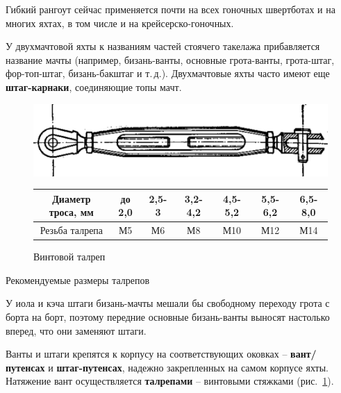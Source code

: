 \documentclass[a4paper, 12pt, twoside, final]{scrbook}
\begin{document}
Гибкий рангоут сейчас применяется почти на всех гоночных швертботах
и на многих яхтах, в том числе и на крейсерско-гоночных.

У двухмачтовой яхты к названиям частей стоячего такелажа прибавляется
название мачты (например, бизань-ванты, основные грота-ванты, грота-штаг,
фор-топ-штаг, бизань-бакштаг и т.\,д.). Двухмачтовые яхты часто имеют
еще \textbf{штаг-карнаки}, соединяющие топы мачт.

\begin{figure}[htbp]
\begin{centering}
\includegraphics{Vintovoj_talrep}
\par\end{centering}

\protect\caption{\label{fig:40}Винтовой талреп}


\bigskip{}


\begin{centering}
\begin{tabular}{|c|c|c|c|c|c|c|}
\hline 
Диаметр троса, мм & до 2,0 & 2,5\-- 3 & 3,2\-- 4,2 & 4,5\-- 5,2 & 5,5\-- 6,2 & 6,5\-- 8,0\tabularnewline
\hline 
Резьба талрепа & М5 & М6 & М8 & М10 & М12 & М14\tabularnewline
\hline 
\end{tabular}
\par\end{centering}


\end{figure}

\begin{table}
\protect\caption{Рекомендуемые размеры талрепов}


\end{table}

У иола и кэча штаги бизань-мачты мешали бы свободному переходу грота
с борта на борт, поэтому передние основные бизань-ванты выносят настолько
вперед, что они заменяют штаги.

Ванты и штаги крепятся к корпусу на соответствующих оковках \--- \textbf{вант\-/путенсах}
и \textbf{штаг-путенсах}, надежно закрепленных на самом корпусе яхты.
Натяжение вант осуществляется \textbf{талрепами} \--- винтовыми стяжками (рис.~\ref{fig:40}).
\end{document}
